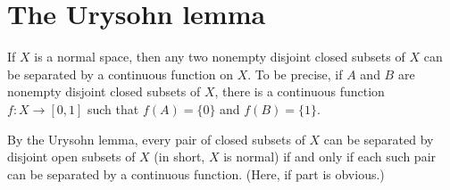 \section{The Urysohn lemma}
\begin{thm}\label{Urysohn lemma}
    If $X$ is a normal space, then any two nonempty disjoint closed subsets of $X$ can be separated by a continuous function on $X$.
    To be precise, if $A$ and $B$ are nonempty disjoint closed subsets of $X$, there is a continuous function $f: X\rightarrow[0, 1]$ such that $f(A)=\{0\}$ and $f(B)=\{1\}$.
\end{thm}
\begin{rmk}
    By the Urysohn lemma, every pair of closed subsets of $X$ can be separated by disjoint open subsets of $X$ (in short, $X$ is normal) if and only if each such pair can be separated by a continuous function.
    (Here, if part is obvious.)
\end{rmk}
